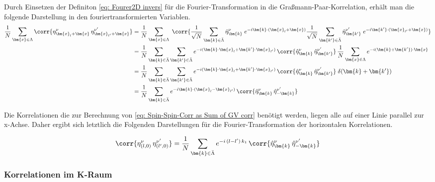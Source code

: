 \noindent Durch Einsetzen der Definiton \eqref{eq: Fourer2D invers} für die Fourier-Transformation in die Graßmann-Paar-Korrelation, erhält man die folgende Darstellung in den fouriertransformierten Variablen.
\begin{align} \label{eq: ft_gv_pair_corr}
\frac{1}{N} \sum_{\bm{x} \in \Lambda} \corr{\eta_{\bm{x}_l + \bm{x}}^{\nu} \,\eta_{\bm{x}_{l'} + \bm{x}}^{\nu'} }
& = \frac{1}{N} \sum_{\bm{x} \in \Lambda} \; \corr{\frac{1}{\sqrt{N}} \sum_{\bm{k} \in \bar{\Lambda}} \hat{\eta}_{\bm{k}}^{\nu}\; e^{-i \bm{k} \cdot (\bm{x}_l + \bm{x})} \frac{1}{\sqrt{N}} \sum_{\bm{k'} \in \bar{\Lambda}} \hat{\eta}_{\bm{k'}}^{\nu'}\; e^{-i  \bm{k'} \cdot (\bm{x}_{l'}+\bm{x})}} \nonumber \\
&  = \frac{1}{N} \sum_{\bm{k} \in \bar{\Lambda}} \sum_{\bm{k'} \in \bar{\Lambda}} e^{-i  (\bm{k} \cdot \bm{x}_l + \bm{k'} \cdot \bm{x}_{l'})} \, \corr{\hat{\eta}_{\bm{k}}^{\nu}\, \hat{\eta}_{\bm{k'}}^{\nu'}} \, \frac{1}{N} \sum_{\bm{x} \in \Lambda} e^{-i (\bm{k} + \bm{k'})\cdot \bm{x} } \nonumber \\ 
&  = \frac{1}{N} \sum_{\bm{k} \in \bar{\Lambda}} \sum_{\bm{k'} \in \bar{\Lambda}} e^{-i  (\bm{k} \cdot \bm{x}_l + \bm{k'} \cdot \bm{x}_{l'})} \, \corr{\hat{\eta}_{\bm{k}}^{\nu} \, \hat{\eta}_{\bm{k'}}^{\nu'}} \; \delta(\bm{k} + \bm{k'}) \nonumber \\
& = \frac{1}{N} \sum_{\bm{k} \in \bar{\Lambda}}  e^{-i  \bm{k} \cdot (\bm{x}_l - \bm{x}_{l'})} \,\corr{\hat{\eta}_{\bm{k}}^{\nu}\, \hat{\eta}_{-\bm{k}}^{\nu'}} \nonumber
\end{align}

\noindent Die Korrelationen die zur Berechnung von \eqref{eq: Spin-Spin-Corr as Sum of GV corr} benötigt werden, liegen alle auf einer Linie parallel zur x-Achse. Daher ergibt sich letztlich die Folgenden Darstellungen für die Fourier-Transformation der horizontalen Korrelationen.

\begin{grayframe}[frametitle = {Fouriertransformierte horizontale Graßmann-Korrelationen}]
\begin{equation} \label{eq: horz_gv_pair_corr}
\corr{\eta^{\nu}_{(l,0)}\, \eta^{\nu'}_{(l', 0)} } = \frac{1}{N} \sum_{\bm{k} \in \bar{\Lambda}}  e^{-i\,(l- l') \,k_1} \,\corr{\hat{\eta}_{\bm{k}}^{\nu}\, \hat{\eta}_{-\bm{k}}^{\nu'}}
\end{equation} 
\end{grayframe}

\subsubsection{Korrelationen im K-Raum}


